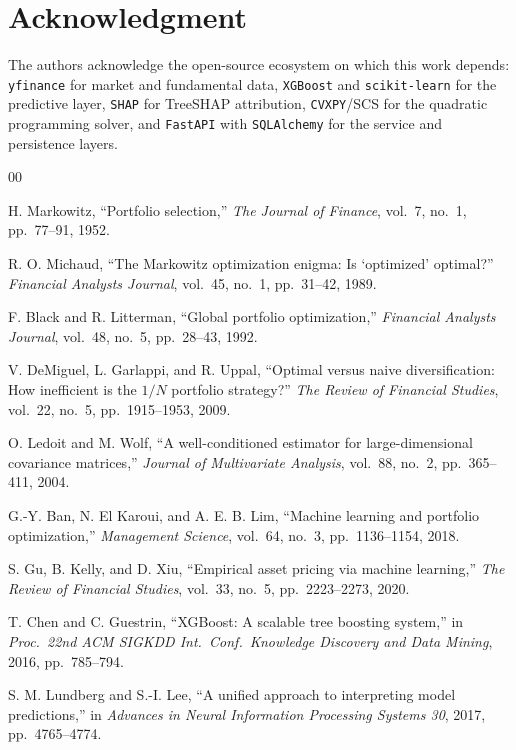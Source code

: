 \documentclass[conference]{IEEEtran}
\begin{document}
\section*{Acknowledgment}

The authors acknowledge the open-source ecosystem on which this work
depends: \texttt{yfinance} for market and fundamental data,
\texttt{XGBoost} and \texttt{scikit-learn} for the predictive layer,
\texttt{SHAP} for TreeSHAP attribution, \texttt{CVXPY}/SCS for the
quadratic programming solver, and \texttt{FastAPI} with
\texttt{SQLAlchemy} for the service and persistence layers.

\begin{thebibliography}{00}

 H. Markowitz, ``Portfolio selection,''
\emph{The Journal of Finance}, vol.~7, no.~1, pp.~77--91, 1952.

 R. O. Michaud, ``The Markowitz optimization
enigma: Is `optimized' optimal?'' \emph{Financial Analysts Journal},
vol.~45, no.~1, pp.~31--42, 1989.

 F. Black and R. Litterman, ``Global
portfolio optimization,'' \emph{Financial Analysts Journal}, vol.~48,
no.~5, pp.~28--43, 1992.

 V. DeMiguel, L. Garlappi, and R. Uppal,
``Optimal versus naive diversification: How inefficient is the $1/N$
portfolio strategy?'' \emph{The Review of Financial Studies}, vol.~22,
no.~5, pp.~1915--1953, 2009.

 O. Ledoit and M. Wolf, ``A well-conditioned
estimator for large-dimensional covariance matrices,'' \emph{Journal of
Multivariate Analysis}, vol.~88, no.~2, pp.~365--411, 2004.

 G.-Y. Ban, N. El Karoui, and A. E. B. Lim, ``Machine
learning and portfolio optimization,'' \emph{Management Science},
vol.~64, no.~3, pp.~1136--1154, 2018.

 S. Gu, B. Kelly, and D. Xiu, ``Empirical asset pricing
via machine learning,'' \emph{The Review of Financial Studies},
vol.~33, no.~5, pp.~2223--2273, 2020.

 T. Chen and C. Guestrin, ``XGBoost: A scalable tree
boosting system,'' in \emph{Proc.\ 22nd ACM SIGKDD Int.\ Conf.\
Knowledge Discovery and Data Mining}, 2016, pp.~785--794.

 S. M. Lundberg and S.-I. Lee, ``A unified
approach to interpreting model predictions,'' in \emph{Advances in
Neural Information Processing Systems 30}, 2017, pp.~4765--4774.


\end{thebibliography}
\end{document}
